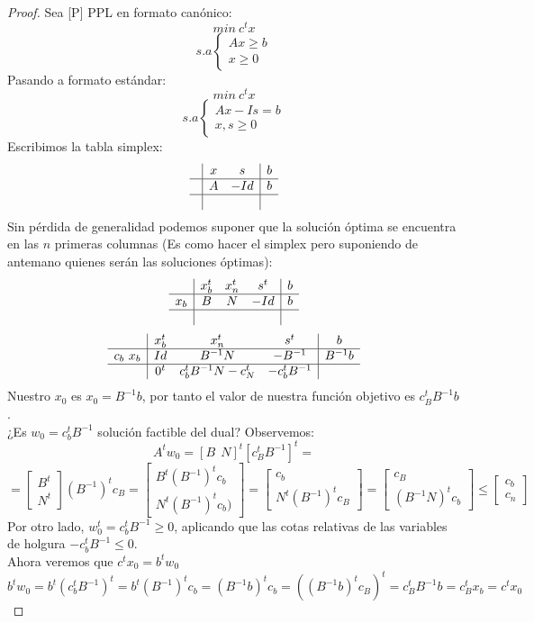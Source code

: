 \documentclass[11pt,fleqn]{book} %
\begin{document}
\begin{proof}
  Sea [P] PPL en formato canónico:
  $$
  min ~ c^t x
  $$
  $$s.a \left\{
  \begin{array}{c}
	Ax\geq b \\
	x \geq 0
  \end{array}
  \right.
  $$
  Pasando a formato estándar:
  $$
  min ~ c^t x
  $$
  $$s.a \left\{
  \begin{array}{c}
	Ax-Is=b \\
	x, s \geq 0
  \end{array}
  \right.
  $$
  Escribimos la tabla simplex:
  $$
  \begin{array}{c|cc|c}
	& x & s & b\\ \hline
	& A & - Id & b \\ \hline
	& & &
  \end{array}
  $$
  Sin pérdida de generalidad podemos suponer que la solución óptima se encuentra en las $n$ primeras columnas (Es como hacer el simplex pero suponiendo de antemano quienes serán las soluciones óptimas):
  $$
  \begin{array}{c|ccc|c}
	& x_b^t & x_n^t & s^t  & b\\ \hline
	x_b& B & N & - Id & b \\ \hline
	& & & &
  \end{array}
  $$
  $$
  \begin{array}{c|ccc|c}
	& x_b^t & x_n^t & s^t  & b\\ \hline
	c_b ~ x_b & Id &B^{-1} N & - B^{-1} &  B^{-1}b \\ \hline
	& 0^t & c_b^tB^{-1}N-c_N^t& -c_b^t B^{-1} &
  \end{array}
  $$
  Nuestro $x_0$ es $x_0=B^{-1}b$, por tanto el valor de nuestra función objetivo es $c_B^t B^{-1}b$. \\
  ¿Es $w_0=c_b^t B^{-1}$ solución factible del dual? Observemos:
  $$A^tw_0=[B ~ ~N]^t[c_B^t B^{-1}]^t=$$
  $$=\left[\begin{array}{c}
	  B^t \\ N^t
	\end{array}\right](B^{-1})^t c_B=\left[\begin{array}{c}
	  B^t (B^{-1})^t c_b \\ N^t(B^{-1})^tc_b)
	\end{array}\right]=\left[\begin{array}{c}
	  c_b \\ N^t(B^{-1})^t c_B
	\end{array}\right]=\left[\begin{array}{c}
	  c_B \\ (B^{-1}N )^t c_b
	\end{array}\right] \leq \left[\begin{array}{c}
	  c_b \\ c_n
	\end{array}\right]$$
  Por otro lado, $w_0^t=c_b^t B^{-1}\geq 0$, aplicando que las cotas relativas de las variables de holgura $-c_b^tB^{-1} \leq 0$. \\
  Ahora veremos que $c^tx_0=b^t w_0$
  $$b^t w_0= b^t (c_b^t B^{-1})^t=b^t (B^{-1})^t c_b=(B^{-1}b)^tc_b=((B^{-1}b)^t c_B)^t=c_B^t B^{-1}b=c_B^t x_b=c^t x_0$$
\end{proof}
\end{document}
